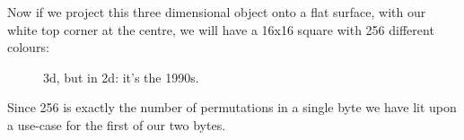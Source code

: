 Now if we project this three dimensional object onto a flat surface, with our white top corner at the centre, we will have a 16x16 square
with 256 different colours:

\begin{figure}[H]
    \centering
    \begin{adjustbox}{width=4cm,center}
    \end{adjustbox}
\caption{3d, but in 2d: it's the 1990s.}
\end{figure}

Since 256 is exactly the number of permutations in a single byte we have lit upon a use-case for the first of our two bytes.

